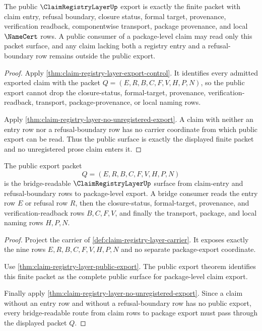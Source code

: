 \begin{theorem}
\label{thm:claim-registry-layer-public-export}
The public $\ClaimRegistryLayerUp$ export is exactly the finite packet with claim entry, refusal boundary, closure status, formal target, provenance, verification readback, componentwise transport, package provenance, and local $\NameCert$ rows. A public consumer of a package-level claim may read only this packet surface, and any claim lacking both a registry entry and a refusal-boundary row remains outside the public export.
\end{theorem}
\begin{proof}
Apply \autoref{thm:claim-registry-layer-export-control}. It identifies every admitted exported claim with the packet $Q=(E,R,B,C,F,V,H,P,N)$, so the public export cannot drop the closure-status, formal-target, provenance, verification-readback, transport, package-provenance, or local naming rows.

Apply \autoref{thm:claim-registry-layer-no-unregistered-export}. A claim with neither an entry row nor a refusal-boundary row has no carrier coordinate from which public export can be read. Thus the public surface is exactly the displayed finite packet and no unregistered prose claim enters it.
\end{proof}

\begin{theorem}
\label{thm:claim-registry-layer-bridge-route}
The public export packet
$$
Q=(E,R,B,C,F,V,H,P,N)
$$
is the bridge-readable $\ClaimRegistryLayerUp$ surface from claim-entry and refusal-boundary rows to package-level export. A bridge consumer reads the entry row $E$ or refusal row $R$, then the closure-status, formal-target, provenance, and verification-readback rows $B,C,F,V$, and finally the transport, package, and local naming rows $H,P,N$.
\end{theorem}
\begin{proof}
Project the carrier of \autoref{def:claim-registry-layer-carrier}. It exposes exactly the nine rows $E,R,B,C,F,V,H,P,N$ and no separate package-export coordinate.

Use \autoref{thm:claim-registry-layer-public-export}. The public export theorem identifies this finite packet as the complete public surface for package-level claim export.

Finally apply \autoref{thm:claim-registry-layer-no-unregistered-export}. Since a claim without an entry row and without a refusal-boundary row has no public export, every bridge-readable route from claim rows to package export must pass through the displayed packet $Q$.
\end{proof}

